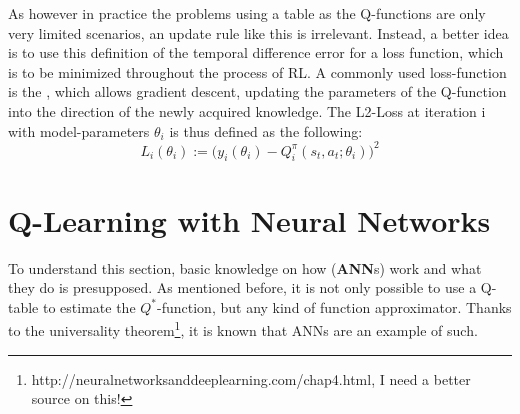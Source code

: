 As however in practice the problems using a table as the Q-functions are only very limited scenarios, an update rule like this is irrelevant. Instead, a better idea is to use this definition of the temporal difference error for a loss function, which is to be minimized throughout the process of RL. A commonly used loss-function is the , which allows gradient descent, updating the parameters of the Q-function into the direction of the newly acquired knowledge. The L2-Loss at iteration i with model-parameters $\theta_i$ is thus defined as the following:
\begin{equation} \label{eq:1.6}
L_i(\theta_i) := \Big( y_i(\theta_i) - Q_i^\pi(s_t, a_t; \theta_i)\Big)^2
\end{equation}



%

\section{Q-Learning with Neural Networks}

To understand this section, basic knowledge on how  (\textbf{ANN}s) work and what they do is presupposed. As mentioned before, it is not only possible to use a Q-table to estimate the $Q^*$-function, but any kind of function approximator. Thanks to the universality theorem\footnote{http://neuralnetworksanddeeplearning.com/chap4.html, I need a better source on this!}, it is known that ANNs are an example of such. \\

